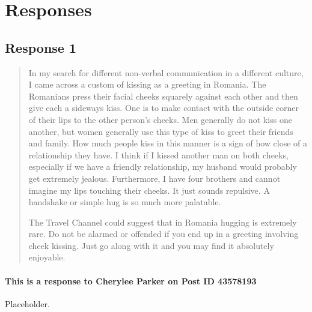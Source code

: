 
\section{Responses}
  \subsection{Response 1}
    \begin{quotation}
      In my search for different non-verbal communication in a different
        culture, I came across a custom of kissing as a greeting in Romania.
        The Romanians press their facial cheeks squarely against each other and
        then give each a sideways kiss.  One is to make contact with the outside
        corner of their lips to the other person’s cheeks. Men generally do not
        kiss one another, but women generally use this type of kiss to greet
        their friends and family.  How much people kiss in this manner is a
        sign of how close of a relationship they have. I think if I kissed
        another man on both cheeks, especially if we have a friendly
        relationship, my husband would probably get extremely jealous.
        Furthermore, I have four brothers and cannot imagine my lips touching
        their cheeks. It just sounds repulsive.  A handshake or simple hug is
        so much more palatable.

      The Travel Channel could suggest that in Romania hugging is extremely
        rare. Do not be alarmed or offended if you end up in a greeting
        involving cheek kissing. Just go along with it and you may find it
        absolutely enjoyable.
    \end{quotation}

    \paragraph{This is a response to Cherylee Parker on Post ID 43578193}
      Placeholder.
